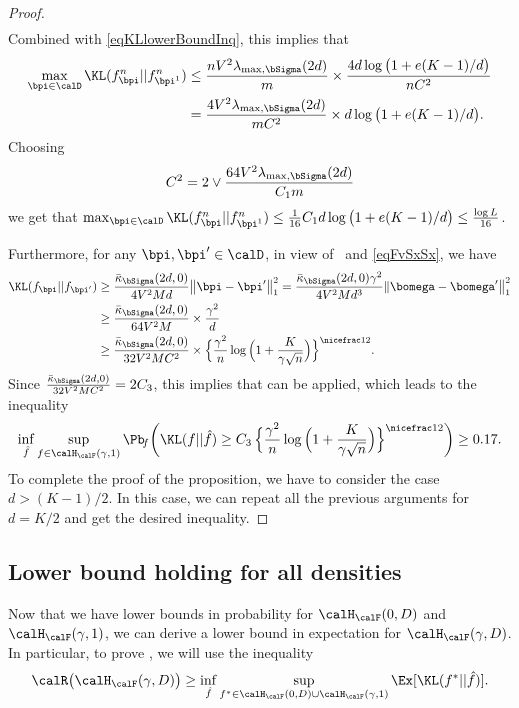 \begin{proof}
\begin{align}
\end{align}
Combined with \cref{eqKLlowerBoundInq}, this implies that
\begin{align}
\max_{\bpi\in\calD}\KL(f^n_{\bpi}||f^n_{\bpi^1})
        &\leq \frac{nV^2\lambda_{\max,\bSigma}(2d)}{m}\times \frac{4d\log\big(1+e(K-1)/d\big)}{nC^2}\\
        &= \frac{4V^2\lambda_{\max,\bSigma}(2d)}{m C^2}\times {d\log\big(1+e(K-1)/d\big)}.
\end{align}
Choosing%
$$
C^2 = 2\vee\frac{64 V^2\lambda_{\max,\bSigma}(2d)}{C_1 m}
$$
we get that $\max_{\bpi\in\calD}\KL(f^n_{\bpi}||f^n_{\bpi^1})\le \frac1{16} C_1{d\log\big(1+e(K-1)/d\big)}\le
\frac{\log L}{16}$.

Furthermore, for any $\bpi,\bpi'\in\calD$, in view of~ and \eqref{eqFvSxSx}, we have
\begin{align}
\KL(f_{\bpi} || f_{\bpi'}) &\geq \frac{\bar\kappa_{\bSigma}(2d,0)}{4V^2M d} \big{\|}\bpi - \bpi'\big{\|}_1^2
=\frac{\bar\kappa_{\bSigma}(2d,0)\gamma^2}{4V^2M d^3} \|\bomega - \bomega'\big\|_1^2\\
&\geq \frac{\bar\kappa_{\bSigma}(2d,0)}{64V^2M}\times \frac{\gamma^2}{d}\\
&\geq \frac{\bar\kappa_{\bSigma}(2d,0)}{32V^2M C^2}\times 
\Big\{{\frac{\gamma^2}n\log\Big(1+\frac{K}{\gamma\sqrt{n}}\Big)}\Big\}^{\nicefrac12}.
\end{align}
Since $\frac{\bar\kappa_{\bSigma}(2d,0)}{32V^2M C^2} = 2C_3$, this implies that 
 can be applied, which leads to the inequality
\begin{equation}
\inf_{\hat f}\sup_{f \in \calH_\calF(\gamma,1)}\Pb\!_{f}\bigg(\KL(f||\hat f)\geq
C_3\,\Big\{{\frac{\gamma^2}n\log\Big(1+\frac{K}{\gamma\sqrt{n}}\Big)}\Big\}^{\nicefrac12}\bigg)\geq 0.17.
\end{equation}
To complete the proof of the proposition, we have to consider the case $d > (K-1)/2$. In this case,
we can repeat all the previous arguments for $d= K/2$ and get the desired inequality.
\end{proof}

\subsection{Lower bound holding for all densities} %

Now that we have lower bounds in probability for $\calH_\calF(0,D)$ and $\calH_\calF(\gamma,1)$, we can derive a lower bound in expectation for
$\calH_\calF(\gamma,D)$. In particular, to prove ,
we will use the inequality
\begin{equation}\label{eqFvSxSev}
\calR\big(\calH_{\calF}(\gamma,D)\big)  \ge \inf_{\hat f}
\sup_{f^*\in \calH_\calF(0,D)\cup \calH_\calF(\gamma,1)} \Ex[\KL(f^*||\hat f)].
\end{equation}



